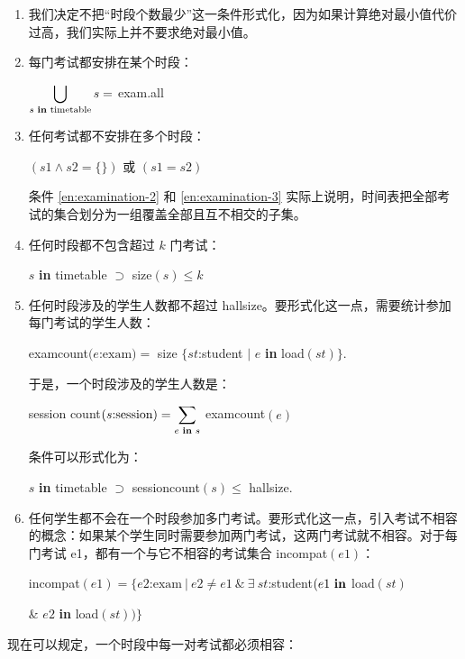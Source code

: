 \begin{enumerate}[wide, nosep, label=(\arabic*)]
	\item \label{en:examination-1}
	我们决定不把“时段个数最少”这一条件形式化，因为如果计算绝对最小值代价过高，我们实际上并不要求绝对最小值。

	\item \label{en:examination-2}
	每门考试都安排在某个时段：

	$\displaystyle\bigcup_{s\text{ \textbf{in} timetable}} s =$ exam.all
	\smallskip

	\item \label{en:examination-3}
	任何考试都不安排在多个时段：

	\quad $(s1 \wedge s2 = \{\})$ 或 $(s1 = s2)$

	\noindent
	条件 \ref{en:examination-2} 和 \ref{en:examination-3} 实际上说明，时间表把全部考试的集合划分为一组覆盖全部且互不相交的子集。

	\item \label{en:examination-4}
	任何时段都不包含超过 $k$ 门考试：

	\quad $s$ \textbf{in} timetable $\supset$ size$(s) \leqslant k$

	\item \label{en:examination-5}
	任何时段涉及的学生人数都不超过 hallsize。要形式化这一点，需要统计参加每门考试的学生人数：
	
	\quad examcount$(e$:$\text{exam}) = $ size $\{st$:student $\mid$ $e$ \textbf{in} load$(st)\}$.
	
	于是，一个时段涉及的学生人数是：
	
	\quad session count$(s\text{:session}) = \displaystyle\sum_{e \text{ \textbf{in} } s}$ examcount$(e)$
	
	条件可以形式化为：
	
	\quad $s$ \textbf{in} timetable $\supset$ sessioncount$(s) \leqslant$ hallsize.
	
	\item \label{en:examination-6}
	任何学生都不会在一个时段参加多门考试。要形式化这一点，引入考试不相容的概念：如果某个学生同时需要参加两门考试，这两门考试就不相容。对于每门考试 e1，都有一个与它不相容的考试集合 incompat$(e1)$：
	
	\quad incompat$(e1)= \{e2\text{:exam}\ |\ e2 \neq e1\ \&\ \exists\ st$:student$(e1 \text{ \textbf{in}}$ load$(st)$
		
	\tabto*{8.2em} \& $e2$ \textbf{in} load$(st))\}$
\end{enumerate}

\noindent
现在可以规定，一个时段中每一对考试都必须相容：

